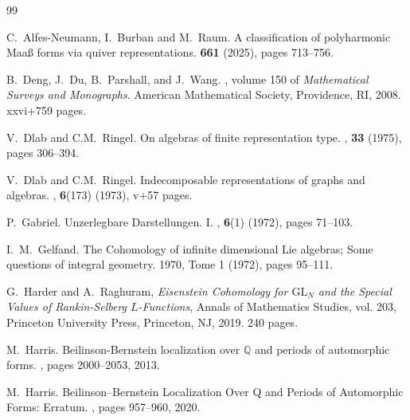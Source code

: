 \documentclass[a4paper,12pt,reqno]{amsart}
\theoremstyle{plain}
\theoremstyle{remark}
\begin{document}
    \begin{thebibliography}{99}

      C.~Alfes-Neumann, I.~Burban and M.~Raum.
      \newblock A classification of polyharmonic Maa\ss{} forms via quiver representations.
       \textbf{661} (2025),
      pages 713--756.

      B.~Deng, J.~Du, B.~Parshall, and J.~Wang.
      , volume 150 of {\em Mathematical Surveys and Monographs}.
      \newblock American Mathematical Society, Providence, RI, 2008.
      xxvi+759 pages.

      V.~Dlab and C.M.~Ringel.
      \newblock On algebras of finite representation type.
      , {\bf 33} (1975),
      pages 306--394.

       V.~Dlab and C.M.~Ringel.
       \newblock Indecomposable representations of graphs and algebras.
       , {\bf 6}(173) (1973),
       v+57 pages.

      P.~Gabriel.
      \newblock Unzerlegbare Darstellungen. I.
      , {\bf 6}(1) (1972),
      pages 71--103.

      I.~M.~Gelfand.
      \newblock The Cohomology of infinite dimensional Lie algebras; Some questions of integral geometry.
       1970, Tome 1 (1972),
      pages 95--111.
      
      G.~Harder and A.~Raghuram, \emph{Eisenstein Cohomology for $\mathrm{GL}_N$ and the Special Values of Rankin-Selberg $L$-Functions},
      \newblock Annals of Mathematics Studies, vol. 203, Princeton University Press, Princeton, NJ, 2019.
      240 pages.

      M.~Harris.
      \newblock Beilinson-Bernstein localization over {${\mathbb{Q}}$} and periods
      of automorphic forms.
      ,
      pages 2000--2053, 2013.
      
      M.~Harris.
      \newblock Beilinson--Bernstein Localization Over {Q} and Periods
      of Automorphic Forms: Erratum.
      ,
      pages 957--960, 2020.


\end{thebibliography}
\end{document}

